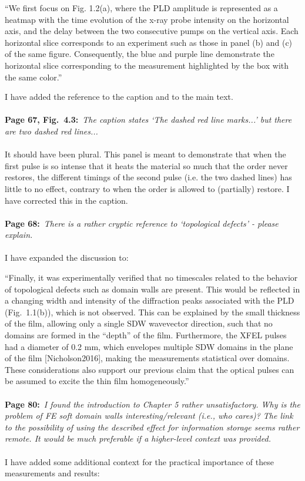 \documentclass[a4, UTF8]{article}
\begin{document}
``We first focus on Fig. 1.2(a), where
the PLD amplitude is represented as a heatmap with the time evolution of the x-ray probe intensity on the horizontal axis, and the delay between the two consecutive pumps on the vertical axis. Each horizontal slice corresponds to an experiment such as those in panel (b) and (c) of the same figure. Consequently, the blue and purple line demonstrate the horizontal slice corresponding to the measurement highlighted by the box with the same color.''

I have added the reference to the caption and to the main text.
\\\\
{\bf Page 67, Fig.~4.3:}~{\it The caption states `The dashed red line marks...’ but there are two dashed red lines...}
\\\\
It should have been plural. This panel is meant to demonstrate that when the first pulse is so intense that it heats the material so much that the order never restores, the different timings of the second pulse (i.e. the two dashed lines) has little to no effect, contrary to when the order is allowed to (partially) restore.
I have corrected this in the caption.
\\\\
{\bf Page 68:}~{\it There is a rather cryptic reference to `topological defects' - please explain.}
\\\\
I have expanded the discussion to:

``Finally, it was experimentally verified that no timescales related to the behavior of topological defects such as domain walls are present. This would be reflected in a changing width and intensity of the diffraction peaks associated with the PLD (Fig.~1.1(b)), which is not observed. This can be explained by the small thickness of the film, allowing only a single SDW wavevector direction, such that no domains are formed in the ``depth'' of the film. Furthermore, the XFEL pulses had a diameter of 0.2 mm, which envelopes multiple SDW domains in the plane of the film [Nicholson2016], making the measurements statistical over domains.
These considerations also support our previous claim that the optical pulses can be assumed to excite the thin film homogeneously.''
\\\\
{\bf Page 80:}~{\it I found the introduction to Chapter 5 rather unsatisfactory. Why is the problem of FE soft domain walls interesting/relevant (i.e., who cares)? The link to the possibility of using the described effect for information storage seems rather remote. It would be much preferable if a
higher-level context was provided.}
\\\\
I have added some additional context for the practical importance of these measurements and results:
\end{document}
